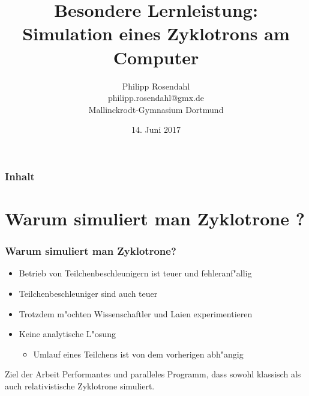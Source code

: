 \documentclass{beamer}
\begin{document}
\title{\bfseries \Large Besondere Lernleistung: \\ \Huge \color{titleblue}Simulation eines Zyklotrons am Computer}
\author{Philipp Rosendahl \\ philipp.rosendahl@gmx.de \\ Mallinckrodt-Gymnasium Dortmund}
\date{14. Juni 2017}

\maketitle 

\begin{frame}
\frametitle{Inhalt}
\tableofcontents
\end{frame}


\section{Warum simuliert man Zyklotrone ?}
\frame{\tableofcontents[currentsection]}


\begin{frame}
\frametitle{Warum simuliert man Zyklotrone?}
\begin{itemize}
  \item<1-> Betrieb von Teilchenbeschleunigern ist teuer und fehleranf"allig
  \item<2-> Teilchenbeschleuniger sind auch teuer
  \item<3-> Trotzdem m"ochten Wissenschaftler und Laien experimentieren
  \item<4-> Keine analytische L"osung
  \begin{itemize}
    \item<5-> Umlauf eines Teilchens ist von dem vorherigen abh"angig
  \end{itemize}
\end{itemize}
\end{frame}


\begin{frame}
\begin{block}{Ziel der Arbeit}
  Performantes und  paralleles Programm, dass sowohl klassisch als auch relativistische 
  Zyklotrone simuliert.
\end{block}
\end{frame}
\end{document}
